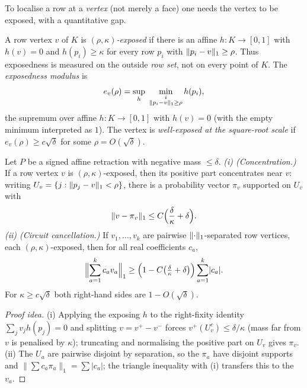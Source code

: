 To localise a row at a \emph{vertex} (not merely a face) one needs the vertex to
be exposed, with a quantitative gap.

\begin{definition}\label{def:exposed}
A row vertex $v$ of $K$ is \emph{$(\rho,\kappa)$-exposed} if there is an affine
$h\colon K\to[0,1]$ with $h(v)=0$ and $h(p_i)\ge\kappa$ for every row $p_i$
with $\lVert p_i-v \rVert_1\ge\rho$. Thus exposedness is measured on the outside
\emph{row set}, not on every point of $K$. The \emph{exposedness modulus} is
\[
  e_v(\rho)=\sup_{h}\ \min_{\substack{i\\ \lVert p_i-v \rVert_1\ge\rho}}h(p_i),
\]
the supremum over affine $h\colon K\to[0,1]$ with $h(v)=0$ (with the empty
minimum interpreted as $1$). The vertex is \emph{well-exposed at the
square-root scale} if $e_v(\rho)\ge c\sqrt\delta$ for some
$\rho=O(\sqrt\delta)$.
\end{definition}

\begin{lemma}\label{lem:exposed-circuit}
Let $P$ be a signed affine retraction with negative mass $\le\delta$.
\emph{(i) (Concentration.)} If a row vertex $v$ is $(\rho,\kappa)$-exposed, then
its positive part concentrates near $v$: writing $U_v=\{j:\lVert p_j-v \rVert_1<\rho\}$,
there is a probability vector $\pi_v$ supported on $U_v$ with
\[
  \lVert v-\pi_v \rVert_1\le C\Bigl(\frac{\delta}{\kappa}+\delta\Bigr).
\]
\emph{(ii) (Circuit cancellation.)} If $v_1,\dots,v_k$ are pairwise
$\lVert \cdot \rVert_1$-separated row vertices, each $(\rho,\kappa)$-exposed, then for
all real coefficients $c_a$,
\[
  \Bigl\lVert\sum_{a=1}^{k}c_a v_a\Bigr\rVert_1
   \ge\Bigl(1-C\bigl(\tfrac{\delta}{\kappa}+\delta\bigr)\Bigr)\sum_{a=1}^{k}\lvert c_a\rvert .
\]
For $\kappa\ge c\sqrt\delta$ both right-hand sides are $1-O(\sqrt\delta)$.
\end{lemma}

\begin{proof}[Proof idea]
(i) Applying the exposing $h$ to the right-fixity identity $\sum_j v_j h(p_j)=0$
and splitting $v=v^{+}-v^{-}$ forces $v^{+}(U_v^{c})\le\delta/\kappa$ (mass far
from $v$ is penalised by $\kappa$); truncating and normalising the positive part
on $U_v$ gives $\pi_v$. (ii) The $U_a$ are pairwise disjoint by separation, so
the $\pi_a$ have disjoint supports and $\lVert\sum c_a\pi_a\rVert_1=\sum|c_a|$;
the triangle inequality with (i) transfers this to the $v_a$.
\end{proof}

